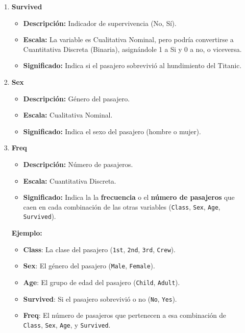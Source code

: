 \documentclass{article}
\begin{document}
\begin{enumerate}
    \item \textbf{Survived}

    \begin{itemize}
        \item \textbf{Descripción:} Indicador de supervivencia (No, Sí).
        \item \textbf{Escala:} La variable es Cualitativa Nominal, pero podría convertirse a Cuantitativa Discreta (Binaria), asignándole 1 a Si y 0 a no, o viceversa.
        \item \textbf{Significado:} Indica si el pasajero sobrevivió al hundimiento del Titanic.
    \end{itemize}

    \item \textbf{Sex}
    
    \begin{itemize}
        \item \textbf{Descripción:} Género del pasajero.
        \item \textbf{Escala:} Cualitativa Nominal.
        \item \textbf{Significado:} Indica el sexo del pasajero (hombre o mujer).
    \end{itemize}

    \item \textbf{Freq}
    
    \begin{itemize}
    \item \textbf{Descripción:} Número de pasajeros.
    \item \textbf{Escala:} Cuantitativa Discreta.
    \item \textbf{Significado:} Indica la la \textbf{frecuencia} o el \textbf{número de pasajeros} que caen en cada combinación de las otras variables (\texttt{Class}, \texttt{Sex}, \texttt{Age}, \texttt{Survived}).
    \end{itemize}    
    
    \textbf{Ejemplo:}    
    \begin{itemize}
        \item \textbf{Class}: La clase del pasajero (\texttt{1st}, \texttt{2nd}, \texttt{3rd}, \texttt{Crew}).
        \item \textbf{Sex}: El género del pasajero (\texttt{Male}, \texttt{Female}).
        \item \textbf{Age}: El grupo de edad del pasajero (\texttt{Child}, \texttt{Adult}).
        \item \textbf{Survived}: Si el pasajero sobrevivió o no (\texttt{No}, \texttt{Yes}).
        \item \textbf{Freq}: El número de pasajeros que pertenecen a esa combinación de \texttt{Class}, \texttt{Sex}, \texttt{Age}, y \texttt{Survived}.
    \end{itemize}
    

\end{enumerate}
\end{document}

